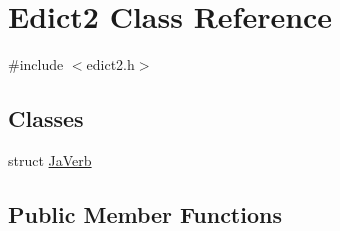 \hypertarget{class_edict2}{}\section{Edict2 Class Reference}
\label{class_edict2}


{\ttfamily \#include $<$edict2.\+h$>$}

\subsection*{Classes}
\begin{DoxyCompactItemize}
\item 
struct \hyperlink{struct_edict2_1_1_ja_verb}{Ja\+Verb}
\end{DoxyCompactItemize}
\subsection*{Public Member Functions}
